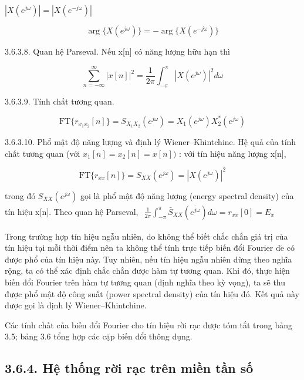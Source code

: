 \documentclass[
  10
]{article}
\begin{document}
\(| X ( e ^ { j \omega } ) | = | X ( e ^ { - j \omega } ) |\)

\[
\arg \{X (e ^ {j \omega}) \} = - \arg \{X (e ^ {- j \omega}) \}
\]

3.6.3.8. Quan hệ Parseval. Nếu x{[}n{]} có năng lượng hữu hạn thì

\[
\sum_ {n = - \infty} ^ {\infty} | x [ n ] | ^ {2} = \frac {1}{2 \pi} \int_ {- \pi} ^ {\pi} | X (e ^ {j \omega}) | ^ {2} d \omega
\]

3.6.3.9. Tính chất tương quan.

\[
\mathrm{FT} \{r _ {x _ {1} x _ {2}} [ n ] \} = S _ {X _ {1} X _ {2}} (e ^ {j \omega}) = X _ {1} (e ^ {j \omega}) X _ {2} ^ {*} (e ^ {j \omega})
\]

3.6.3.10. Phổ mật độ năng lượng và định lý Wiener--Khintchine. Hệ quả
của tính chất tương quan (với
\(x _ { 1 } [ n ] = x _ { 2 } [ n ] = x [ n ] )\) : với tín hiệu năng
lượng x{[}n{]},

\[
\mathrm{FT} \{r _ {x x} [ n ] \} = S _ {X X} (e ^ {j \omega}) = | X (e ^ {j \omega}) | ^ {2}
\]

trong đó \(S _ { X X } ( e ^ { j \omega } )\) gọi là phổ mật độ năng
lượng (energy spectral density) của tín hiệu x{[}n{]}. Theo quan hệ
Parseval,
\(\begin{array} { r } { \frac { 1 } { 2 \pi } \int _ { - \pi } ^ { \pi } \bar { S } _ { X X } ( e ^ { \bar { j } \omega } ) d \omega = r _ { x x } [ 0 ] = E _ { x } } \end{array}\)

Trong trường hợp tín hiệu ngẫu nhiên, do không thể biết chắc chắn giá
trị của tín hiệu tại mỗi thời điểm nên ta không thể tính trực tiếp biến
đổi Fourier \(\mathrm { d } \acute { \mathrm { e } }\) có được phổ của
tín hiệu này. Tuy nhiên, nếu tín hiệu ngẫu nhiên dừng theo nghĩa rộng,
ta có thể xác định chắc chắn được hàm tự tương quan. Khi đó, thực hiện
biến đổi Fourier trên hàm tự tương quan (định nghĩa theo kỳ vọng), ta sẽ
thu được phổ mật độ công suất (power spectral density) của tín hiệu đó.
Kết quả này được gọi là định lý Wiener--Khintchine.

Các tính chất của biến đổi Fourier cho tín hiệu rời rạc được tóm tắt
trong bảng 3.5; bảng 3.6 tổng hợp các cặp biến đổi thông dụng.

\subsection{3.6.4. Hệ thống rời rạc trên miền tần
số}\label{hux1ec7-thux1ed1ng-rux1eddi-rux1ea1c-truxean-miux1ec1n-tux1ea7n-sux1ed1}
\end{document}
